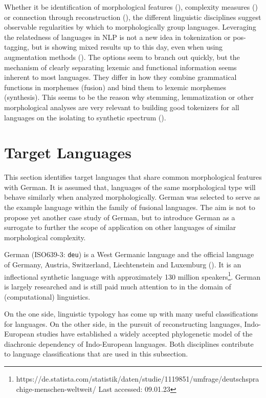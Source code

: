 Whether it be identification of morphological features (\cite[42--56]{comrie1989}), complexity measures (\cite{measuresofMC}) or connection through reconstruction (\cite{INDOEUROPE}),
the different linguistic disciplines suggest observable regularities by which to morphologically group languages.
Leveraging the relatedness of languages in NLP is not a new idea in tokenization or \ac{pos}\hyphen tagging, but is showing mixed results up to this day, even when using augmentation methods (\cite{mixednoiseinterlanguage}).
The options seem to branch out quickly, but the mechanism of clearly separating lexemic and functional information seems inherent to most languages.
They differ in how they combine grammatical functions in morphemes (fusion) and bind them to lexemic morphemes (synthesis).
This seems to be the reason why stemming, lemmatization or other morphological analyses are very relevant to building good tokenizers for all languages on the isolating to synthetic spectrum (\cite[51--53]{POLYSYNTHLM}).


\section{Target Languages}
\label{sec:target-languages}
This section identifies target languages that share common morphological features with German.
It is assumed that, languages of the same morphological type will behave similarly when analyzed morphologically.
German was selected to serve as the example language within the family of fusional languages.
The aim is not to propose yet another case study of German, but to introduce German as a surrogate to further the scope of application on other languages of similar morphological complexity.

German (ISO639-3: \texttt{deu}) is a West Germanic language and the official language of Germany, Austria, Switzerland, Liechtenstein and Luxemburg (\cite{METZLER2016}).
It is an inflectional synthetic language with approximately 130 million speakers\footnote{https://de.statista.com/statistik/daten/studie/1119851/umfrage/deutschsprachige-menschen-weltweit/ Last accessed: 09.01.23}.
German is largely researched and is still paid much attention to in the domain of (computational) linguistics.

On the one side, linguistic typology has come up with many useful classifications for languages.
On the other side, in the pursuit of reconstructing languages, Indo-European studies have established a widely accepted phylogenetic model of the diachronic dependency of Indo-European languages.
Both disciplines contribute to language classifications that are used in this subsection.

